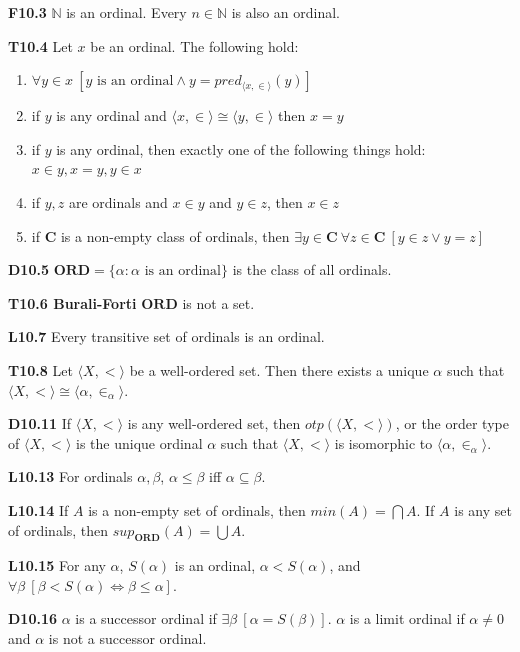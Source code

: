 \documentclass[10pt, landscape]{article}
\begin{document}
\begin{multicols*}{3}
\textbf{F10.3} $\mathbb{N}$ is an ordinal. Every $n \in \mathbb{N}$ is also an ordinal.

\textbf{T10.4} Let $x$ be an ordinal. The following hold:
\begin{enumerate}
    \item $\forall y \in x\ [y \text{ is an ordinal} \land y=pred_{\langle x, \in \rangle}(y)]$
    \item if $y$ is any ordinal and $\langle x,\in\rangle \cong \langle y, \in \rangle$ then $x=y$
    \item if $y$ is any ordinal, then exactly one of the following things hold: $x \in y, x=y, y \in x$
    \item if $y, z$ are ordinals and $x\in y$ and $y \in z$, then $x \in z$
    \item if $\mathbf{C}$ is a non-empty class of ordinals, then $\exists y \in \mathbf{C}\ \forall z \in \mathbf{C}\ [y \in z \lor y =z]$
\end{enumerate}

\textbf{D10.5} $\mathbf{ORD}=\{\alpha:\alpha \text{ is an ordinal}\}$ is the class of all ordinals.

\textbf{T10.6 Burali-Forti} $\mathbf{ORD}$ is not a set.

\textbf{L10.7} Every transitive set of ordinals is an ordinal.

\textbf{T10.8} Let $\langle X, < \rangle$ be a well-ordered set. Then there exists a unique $\alpha$ such that $\langle X,<\rangle\cong\langle\alpha, \in_\alpha\rangle$.

\textbf{D10.11} If $\langle X, <\rangle$ is any well-ordered set, then $otp(\langle X, < \rangle)$, or the order type of $\langle X, < \rangle$ is the unique ordinal $\alpha$ such that $\langle X, <\rangle$ is isomorphic to $\langle \alpha, \in_\alpha\rangle$.

\textbf{L10.13} For ordinals $\alpha, \beta$, $\alpha \leq \beta$ iff $\alpha \subseteq \beta$.

\textbf{L10.14} If $A$ is a non-empty set of ordinals, then $min(A)=\bigcap A$. If $A$ is any set of ordinals, then $sup_{\mathbf{ORD}}(A)=\bigcup A$.

\textbf{L10.15} For any $\alpha$, $S(\alpha)$ is an ordinal, $\alpha < S(\alpha)$, and $\forall\beta\ [\beta<S(\alpha)\Longleftrightarrow \beta \leq \alpha]$.

\textbf{D10.16} $\alpha$ is a successor ordinal if $\exists \beta \ [\alpha=S(\beta)]$. $\alpha$ is a limit ordinal if $\alpha\neq0$ and $\alpha$ is not a successor ordinal.


\end{multicols*}
\end{document}
